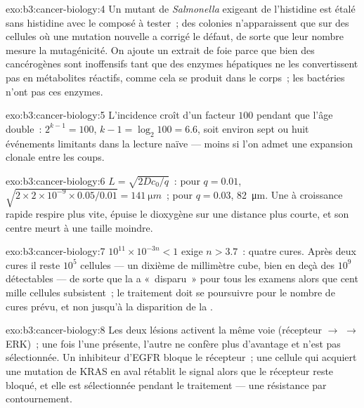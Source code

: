 \begin{solution}{exo:b3:cancer-biology:4}
Un mutant de \emph{Salmonella} exigeant de l'histidine est étalé sans
histidine avec le composé à tester~; des colonies n'apparaissent que
sur des cellules où une mutation nouvelle a corrigé le défaut, de sorte
que leur nombre mesure la mutagénicité. On ajoute un extrait de foie
parce que bien des cancérogènes sont inoffensifs tant que des enzymes
hépatiques ne les convertissent pas en métabolites réactifs, comme cela
se produit dans le corps~; les bactéries n'ont pas ces enzymes.
\end{solution}

\begin{solution}{exo:b3:cancer-biology:5}
L'incidence croît d'un facteur $100$ pendant que l'âge double~:
$2^{k-1} = 100$, $k - 1 =
\log_{2}100 = 6.6$, soit environ sept ou huit événements limitants dans
la lecture naïve --- moins si l'on admet une expansion clonale entre
les coups.
\end{solution}

\begin{solution}{exo:b3:cancer-biology:6}
$L = \sqrt{2Dc_{0}/q}$~: pour $q = 0.01$, $\sqrt{2\times 2\times 10^{-9}
\times 0.05/0.01} = \qty{141}{\micro m}$~; pour $q = 0.03$,
\qty{82}{\micro m}. Une  à croissance rapide respire plus vite,
épuise le dioxygène sur une distance plus courte, et son centre meurt à
une taille moindre.
\end{solution}

\begin{solution}{exo:b3:cancer-biology:7}
$10^{11}\times 10^{-3n} < 1$ exige $n > 3.7$~: quatre cures. Après deux
cures il reste $10^{5}$ cellules --- un dixième de millimètre cube,
bien en deçà des $10^{9}$ détectables --- de sorte que la  a
«~disparu~» pour tous les examens alors que cent mille cellules
subsistent~; le traitement doit se poursuivre pour le nombre de cures
prévu, et non jusqu'à la disparition de la .
\end{solution}

\begin{solution}{exo:b3:cancer-biology:8}
Les deux lésions activent la même voie (récepteur $\to$  $\to$
ERK)~; une fois l'une présente, l'autre ne confère plus d'avantage et
n'est pas sélectionnée. Un inhibiteur d'EGFR bloque le récepteur~; une
cellule qui acquiert une mutation de KRAS en aval rétablit le signal
alors que le récepteur reste bloqué, et elle est sélectionnée pendant
le traitement --- une résistance par contournement.
\end{solution}

